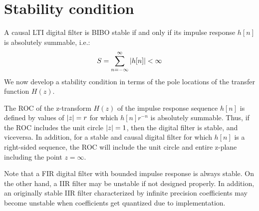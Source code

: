 \documentclass[../../main/main.tex]{subfiles}
\begin{document}

\section{Stability condition}
A causal LTI digital filter is BIBO stable if and only if its impulse response \( h[n] \) is absolutely summable, i.e.:
\begin{equation}
    S
    =
    \sum_{n=-\infty}^{\infty} \abs{h[n]}
    < \infty
    \label{eq:L17_S03_1}
\end{equation}
We now develop a stability condition in terms of the pole locations of the transfer function \( H(z) \).

The ROC of the z-transform \( H(z) \) of the impulse response sequence \( h[n] \) is defined by values of \( \abs{z} = r \) for which \( h[n]r^{-n} \) is absolutely summable. Thus, if the ROC includes the unit circle \( \abs{z} = 1 \), then the digital filter is stable, and viceversa. In addition, for a stable and causal digital filter for which \( h[n] \) is a right-sided sequence, the ROC will include the unit circle and entire z-plane including the point \( z = \infty \).

Note that a FIR digital filter with bounded impulse response is always stable. On the other hand, a IIR filter may be unstable if not designed properly. In addition, an originally stable IIR filter characterized by infinite precision coefficients may become unstable when coefficients get quantized due to implementation.
\end{document}
